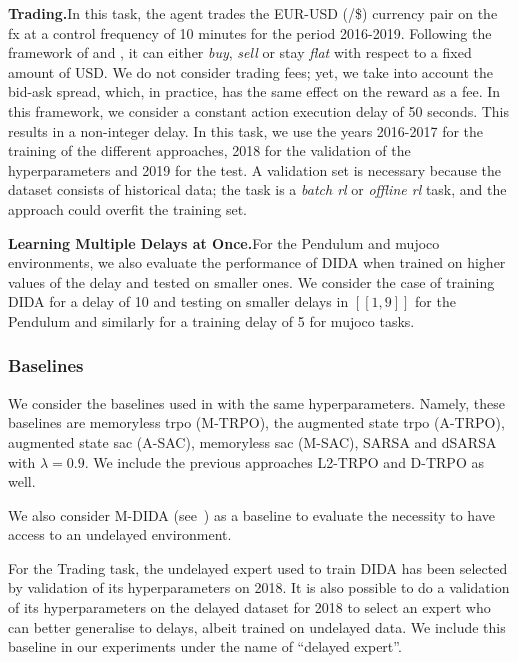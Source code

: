 \noindent\textbf{Trading.}\indent In this task, the agent trades the EUR-USD (\texteuro/\$) currency pair on the \gls{fx} at a control frequency of 10 minutes for the period 2016-2019. 
Following the framework of \cite{bisi2020foreign} and \cite{riva2021learning}, it can either \emph{buy}, \emph{sell} or stay \emph{flat} with respect to a fixed amount of USD.
We do not consider trading fees; yet, we take into account the bid-ask spread, which, in practice, has the same effect on the reward as a fee. 
In this framework, we consider a constant action execution delay of 50 seconds.
This results in a non-integer delay.
In this task, we use the years 2016-2017 for the training of the different approaches, 2018 for the validation of the hyperparameters and 2019 for the test. 
A validation set is necessary because the dataset consists of historical data;
the task is a \emph{batch \gls{rl}} or \emph{offline  \gls{rl}} task,  and the approach could overfit the training set. 

\noindent\textbf{Learning Multiple Delays at Once.}\indent For the Pendulum and mujoco environments, we also evaluate the performance of DIDA when trained on higher values of the delay and tested on smaller ones. 
We consider the case of training DIDA for a delay of 10 and testing on smaller delays in $[\![1,9]\!]$ for the Pendulum and similarly for a training delay of 5 for mujoco tasks.


\subsubsection{Baselines}
We consider the baselines used in  with the same hyperparameters. 
Namely, these baselines are memoryless \gls{trpo} (M-TRPO), the augmented state \gls{trpo} (A-TRPO), augmented state \gls{sac} (A-SAC),  memoryless \gls{sac} (M-SAC), SARSA and dSARSA with $\lambda=0.9$.
We include the previous approaches L2-TRPO and D-TRPO as well.

We also consider M-DIDA (see~) as a baseline to evaluate the necessity to have access to an undelayed environment.

For the Trading task, the undelayed expert used to train DIDA has been selected by validation of its hyperparameters on 2018.
It is also possible to do a validation of its hyperparameters on the delayed dataset for 2018 to select an expert who can better generalise to delays, albeit trained on undelayed data.
We include this baseline in our experiments under the name of ``delayed expert''.

